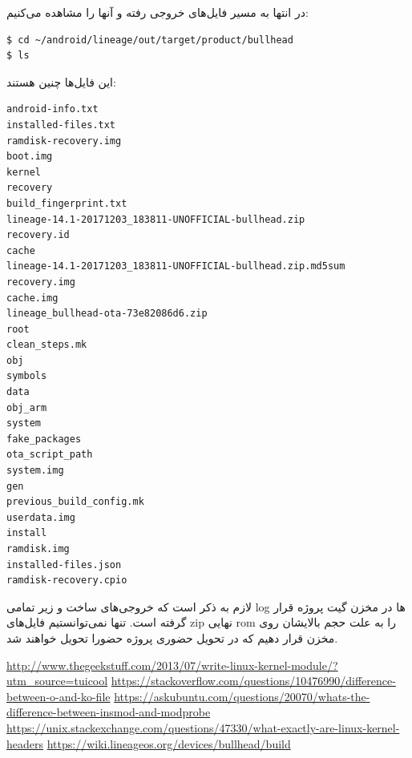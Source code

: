 \documentclass{article}
\begin{document}
در انتها به مسیر فایل‌های خروجی رفته و آنها را مشاهده می‌کنیم:
\begin{latin}
\begin{verbatim}
$ cd ~/android/lineage/out/target/product/bullhead
$ ls
\end{verbatim}
\end{latin}
این فایل‌ها چنین هستند:
\begin{latin}
\begin{verbatim}
android-info.txt       
installed-files.txt                                          
ramdisk-recovery.img
boot.img               
kernel                                                       
recovery
build_fingerprint.txt  
lineage-14.1-20171203_183811-UNOFFICIAL-bullhead.zip         
recovery.id
cache                  
lineage-14.1-20171203_183811-UNOFFICIAL-bullhead.zip.md5sum  
recovery.img
cache.img              
lineage_bullhead-ota-73e82086d6.zip                          
root
clean_steps.mk         
obj                                                          
symbols
data                   
obj_arm                                                      
system
fake_packages          
ota_script_path                                              
system.img
gen                    
previous_build_config.mk                                     
userdata.img
install                
ramdisk.img
installed-files.json   
ramdisk-recovery.cpio
\end{verbatim}
\end{latin}

لازم به ذکر است که خروجی‌های ساخت و زیر تمامی log ها در مخزن گیت پروژه قرار گرفته است. تنها نمی‌توانستیم فایل‌های zip نهایی rom را به علت حجم بالایشان روی مخزن قرار دهیم که در تحویل حضوری پروژه حضورا تحویل خواهند شد.

\begin{thebibliography}{9}

\latin
{}
\url{http://www.thegeekstuff.com/2013/07/write-linux-kernel-module/?utm_source=tuicool}
\url{https://stackoverflow.com/questions/10476990/difference-between-o-and-ko-file}
\url{https://askubuntu.com/questions/20070/whats-the-difference-between-insmod-and-modprobe}
\url{https://unix.stackexchange.com/questions/47330/what-exactly-are-linux-kernel-headers}
\url{https://wiki.lineageos.org/devices/bullhead/build}

\end{thebibliography}
\end{document}
